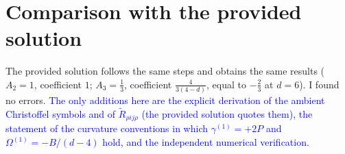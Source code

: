 \documentclass[11pt]{article}
\newcommand{\chg}[1]{\textcolor{blue}{#1}}
\begin{document}
\section{Comparison with the provided solution}
The provided solution follows the same steps and obtains the same results ($A_2=1$, coefficient $1$; $A_3=\frac13$, coefficient $\frac{4}{3(4-d)}$, equal to $-\frac23$ at $d=6$). I found no errors. \chg{The only additions here are the explicit derivation of the ambient Christoffel symbols and of $\tilde R_{\rho ij\rho}$ (the provided solution quotes them), the statement of the curvature conventions in which $\gamma^{(1)}=+2P$ and $\Omega^{(1)}=-B/(d-4)$ hold, and the independent numerical verification.}
\end{document}
